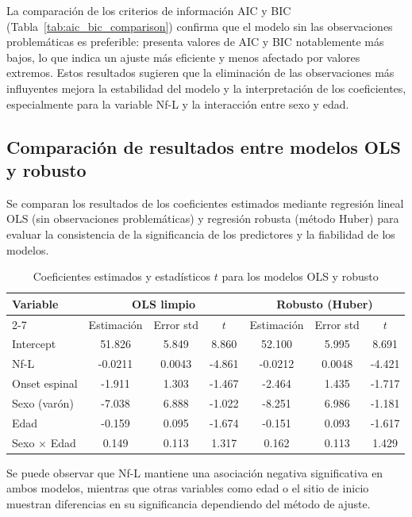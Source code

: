 \documentclass[12pt]{article} %
\begin{document}
La comparación de los criterios de información AIC y BIC (Tabla~\ref{tab:aic_bic_comparison}) confirma que el modelo sin las observaciones problemáticas es preferible: presenta valores de AIC y BIC notablemente más bajos, lo que indica un ajuste más eficiente y menos afectado por valores extremos. Estos resultados sugieren que la eliminación de las observaciones más influyentes mejora la estabilidad del modelo y la interpretación de los coeficientes, especialmente para la variable Nf-L y la interacción entre sexo y edad.

\subsection{Comparación de resultados entre modelos OLS y robusto}

Se comparan los resultados de los coeficientes estimados mediante regresión lineal OLS (sin observaciones problemáticas) y regresión robusta (método Huber) para evaluar la consistencia de la significancia de los predictores y la fiabilidad de los modelos.

\begin{table}[h!]
\centering
\caption{Coeficientes estimados y estadísticos $t$ para los modelos OLS y robusto}
\label{tab:coef_comparison}
\begin{tabular}{lcccccc}
\hline
\multirow{2}{*}{Variable} & \multicolumn{3}{c}{OLS limpio} & \multicolumn{3}{c}{Robusto (Huber)} \\
\cline{2-7}
 & Estimación & Error std & $t$ & Estimación & Error std & $t$ \\
\hline
Intercept & 51.826 & 5.849 & 8.860 & 52.100 & 5.995 & 8.691 \\
Nf-L & -0.0211 & 0.0043 & -4.861 & -0.0212 & 0.0048 & -4.421 \\
Onset espinal & -1.911 & 1.303 & -1.467 & -2.464 & 1.435 & -1.717 \\
Sexo (varón) & -7.038 & 6.888 & -1.022 & -8.251 & 6.986 & -1.181 \\
Edad & -0.159 & 0.095 & -1.674 & -0.151 & 0.093 & -1.617 \\
Sexo $\times$ Edad & 0.149 & 0.113 & 1.317 & 0.162 & 0.113 & 1.429 \\
\hline
\end{tabular}
\end{table}

Se puede observar que Nf-L mantiene una asociación negativa significativa en ambos modelos, mientras que otras variables como edad o el sitio de inicio muestran diferencias en su significancia dependiendo del método de ajuste.
\end{document}
